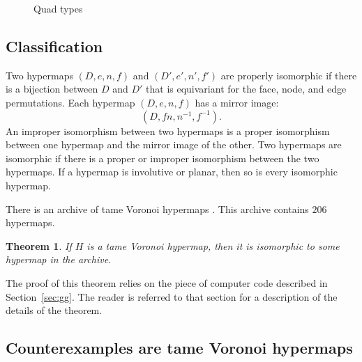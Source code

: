 \documentclass{article} %
\newtheorem{theorem}{Theorem}[section]
\begin{document}
\begin{figure}[htb]
  \begin{center}
   \end{center}
  \caption{Quad types}
\label{fig:quadtype}
\end{figure}




\subsection{Classification}\label{sec:class}


Two hypermaps $(D,e,n,f)$ and $(D',e',n',f')$ are properly isomorphic if there
is a bijection between $D$ and $D'$ that is equivariant for the face, node, and
edge permutations.  Each hypermap $(D,e,n,f)$ has a mirror image:
  $$
  (D,f n, n^{-1},f^{-1}).
  $$
  An improper
isomorphism between two hypermaps is a proper isomorphism between one hypermap and the
mirror image of the other.
Two hypermaps are isomorphic if there is a proper or improper isomorphism between
the two hypermaps. If a hypermap is involutive or planar, then so is every isomorphic
hypermap.


There is an archive of tame Voronoi hypermaps
\cite{McLaughlin:2008:KeplerCode}. This archive contains $206$
hypermaps.

\begin{theorem}\label{thm:class}  
If $H$ is a tame Voronoi hypermap, then it is isomorphic to
some hypermap in the archive.
\end{theorem}

The proof of this theorem relies on the piece of 
computer code described in Section~\ref{sec:gg}.  The reader is referred to that section
for a description of the details of the theorem.

\subsection{Counterexamples are tame Voronoi hypermaps}
\end{document}
